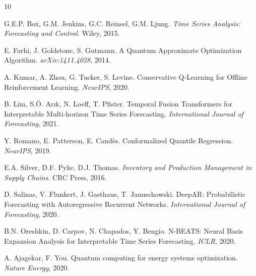 \documentclass{article}
\begin{document}

\begin{thebibliography}{10}

G.E.P. Box, G.M. Jenkins, G.C. Reinsel, G.M. Ljung.
\textit{Time Series Analysis: Forecasting and Control}.
Wiley, 2015.

E. Farhi, J. Goldstone, S. Gutmann.
A Quantum Approximate Optimization Algorithm.
\textit{arXiv:1411.4028}, 2014.

A. Kumar, A. Zhou, G. Tucker, S. Levine.
Conservative Q-Learning for Offline Reinforcement Learning.
\textit{NeurIPS}, 2020.

B. Lim, S.Ö. Arık, N. Loeff, T. Pfister.
Temporal Fusion Transformers for Interpretable Multi-horizon Time Series Forecasting.
\textit{International Journal of Forecasting}, 2021.

Y. Romano, E. Patterson, E. Candès.
Conformalized Quantile Regression.
\textit{NeurIPS}, 2019.

E.A. Silver, D.F. Pyke, D.J. Thomas.
\textit{Inventory and Production Management in Supply Chains}.
CRC Press, 2016.

D. Salinas, V. Flunkert, J. Gasthaus, T. Januschowski.
DeepAR: Probabilistic Forecasting with Autoregressive Recurrent Networks.
\textit{International Journal of Forecasting}, 2020.

B.N. Oreshkin, D. Carpov, N. Chapados, Y. Bengio.
N-BEATS: Neural Basis Expansion Analysis for Interpretable Time Series Forecasting.
\textit{ICLR}, 2020.

A. Ajagekar, F. You.
Quantum computing for energy systems optimization.
\textit{Nature Energy}, 2020.

\end{thebibliography}
\end{document}
